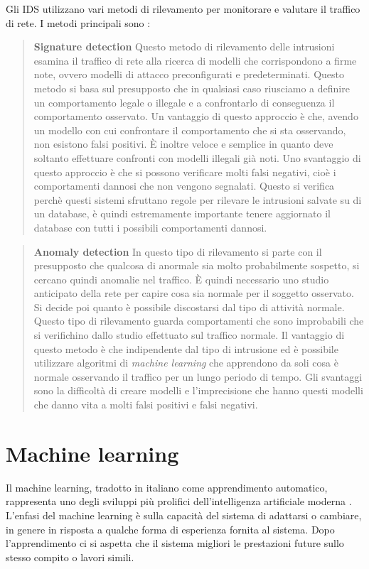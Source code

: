 \documentclass[../main.tex]{subfiles}
\begin{document}
Gli IDS utilizzano vari metodi di rilevamento per monitorare e valutare il traffico di rete. I metodi principali sono \cite{IDS}:

\begin{verse}
				\textbf{Signature detection} Questo metodo di rilevamento delle intrusioni esamina il traffico di rete alla ricerca di modelli che corrispondono a firme note, ovvero modelli di attacco preconfigurati e predeterminati. Questo metodo si basa sul presupposto che in qualsiasi caso riusciamo a definire un comportamento legale o illegale e a confrontarlo di conseguenza il comportamento osservato.
				Un vantaggio di questo approccio è che, avendo un modello con cui confrontare il comportamento che si sta osservando, non esistono falsi positivi. È inoltre veloce e semplice in quanto deve soltanto effettuare confronti con modelli illegali già noti.
				Uno svantaggio di questo approccio è che si possono verificare molti falsi negativi, cioè i comportamenti dannosi che non vengono segnalati. Questo si verifica perchè questi sistemi sfruttano regole per rilevare le intrusioni salvate su di un database, è quindi estremamente importante tenere aggiornato il database con tutti i possibili comportamenti dannosi.
\end{verse}

\begin{verse}
				\textbf{Anomaly detection} In questo tipo di rilevamento si parte con il presupposto che qualcosa di anormale sia molto probabilmente sospetto, si cercano quindi anomalie nel traffico. È quindi necessario uno studio anticipato della rete per capire cosa sia normale per il soggetto osservato. Si decide poi quanto è possibile discostarsi dal tipo di attività normale. Questo tipo di rilevamento guarda comportamenti che sono improbabili che si verifichino dallo studio effettuato sul traffico normale.  
				Il vantaggio di questo metodo è che indipendente dal tipo di intrusione ed è possibile utilizzare algoritmi di \textit{machine learning} che apprendono da soli cosa è normale osservando il traffico per un lungo periodo di tempo.
				Gli svantaggi sono la difficoltà di creare modelli e l'imprecisione che hanno questi modelli che danno vita a molti falsi positivi e falsi negativi.
\end{verse}

\section{Machine learning}
Il machine learning, tradotto in italiano come apprendimento automatico, rappresenta uno degli sviluppi più prolifici dell'intelligenza artificiale moderna \cite{compIntelligence}. L'enfasi del machine learning è sulla capacità del sistema di adattarsi o cambiare, in genere in risposta a qualche forma di esperienza fornita al sistema. Dopo l'apprendimento ci si aspetta che il sistema migliori le prestazioni future sullo stesso compito o lavori simili. 
\end{document}
